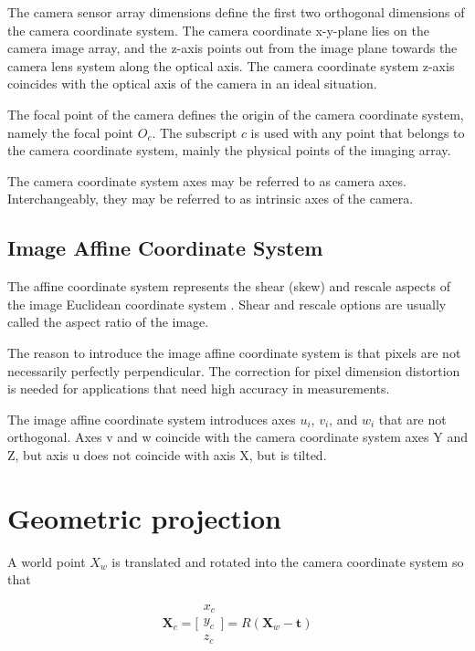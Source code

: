 \documentclass[12pt,a4paper,oneside,pdftex]{report}
\begin{document}
The camera sensor array dimensions define the first two orthogonal dimensions of the camera coordinate system. The camera coordinate x-y-plane lies on the camera image array, and the z-axis points out from the image plane towards the camera lens system along the optical axis. The camera coordinate system z-axis coincides with the optical axis of the camera in an ideal situation.

The focal point of the camera defines the origin of the camera coordinate system, namely the focal point $O_c$. The subscript $c$ is used with any point that belongs to the camera coordinate system, mainly the physical points of the imaging array.

The camera coordinate system axes may be referred to as camera axes. Interchangeably, they may be referred to as intrinsic axes of the camera.

\subsection{Image Affine Coordinate System}

The affine coordinate system represents the shear (skew) and rescale aspects of the image Euclidean coordinate system \cite{Sonka07}. Shear and rescale options are usually called the aspect ratio of the image.  

The reason to introduce the image affine coordinate system is that pixels are not necessarily perfectly perpendicular. The correction for pixel dimension distortion is needed for applications that need high accuracy in measurements.

The image affine coordinate system introduces axes $u_i$, $v_i$, and $w_i$ that are not orthogonal. Axes v and w coincide with the camera coordinate system axes Y and Z, but axis u does not coincide with axis X, but is tilted. 

\section{Geometric projection}

A world point $X_w$ is translated and rotated into the camera coordinate system so that

\begin{equation}
\textbf{X}_c = \Biggl[ \begin{array}{c}
x_c \\
y_c \\
z_c \end{array} \Biggl] = R(\textbf{X}_w - \textbf{t})
\end{equation}
\end{document}
